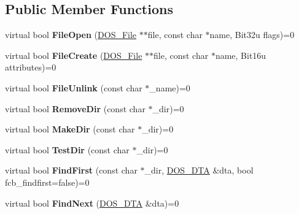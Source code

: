 \subsection*{Public Member Functions}
\begin{DoxyCompactItemize}
\item 
\hypertarget{classDOS__Drive_a89edfab101b6473ab2c78e6d0a60a664}{virtual bool {\bfseries File\-Open} (\hyperlink{classDOS__File}{D\-O\-S\-\_\-\-File} $\ast$$\ast$file, const char $\ast$name, Bit32u flags)=0}\label{classDOS__Drive_a89edfab101b6473ab2c78e6d0a60a664}

\item 
\hypertarget{classDOS__Drive_aadcc90a2e2c8227e245bdb226abdc1d2}{virtual bool {\bfseries File\-Create} (\hyperlink{classDOS__File}{D\-O\-S\-\_\-\-File} $\ast$$\ast$file, const char $\ast$name, Bit16u attributes)=0}\label{classDOS__Drive_aadcc90a2e2c8227e245bdb226abdc1d2}

\item 
\hypertarget{classDOS__Drive_ad82f3601ae44410db65241752bdb0d37}{virtual bool {\bfseries File\-Unlink} (const char $\ast$\-\_\-name)=0}\label{classDOS__Drive_ad82f3601ae44410db65241752bdb0d37}

\item 
\hypertarget{classDOS__Drive_ade3271a57f28cc1a18dc84714dc2611b}{virtual bool {\bfseries Remove\-Dir} (const char $\ast$\-\_\-dir)=0}\label{classDOS__Drive_ade3271a57f28cc1a18dc84714dc2611b}

\item 
\hypertarget{classDOS__Drive_aa16cb38b04fd09608c749d2cf786fd21}{virtual bool {\bfseries Make\-Dir} (const char $\ast$\-\_\-dir)=0}\label{classDOS__Drive_aa16cb38b04fd09608c749d2cf786fd21}

\item 
\hypertarget{classDOS__Drive_a55e8ba77ed5a74e6a27932c3177b0998}{virtual bool {\bfseries Test\-Dir} (const char $\ast$\-\_\-dir)=0}\label{classDOS__Drive_a55e8ba77ed5a74e6a27932c3177b0998}

\item 
\hypertarget{classDOS__Drive_a85a98cf83473db4fb4fd15a7e1d9b21f}{virtual bool {\bfseries Find\-First} (const char $\ast$\-\_\-dir, \hyperlink{classDOS__DTA}{D\-O\-S\-\_\-\-D\-T\-A} \&dta, bool fcb\-\_\-findfirst=false)=0}\label{classDOS__Drive_a85a98cf83473db4fb4fd15a7e1d9b21f}

\item 
\hypertarget{classDOS__Drive_aa2feef7be81869b683b6945159df5149}{virtual bool {\bfseries Find\-Next} (\hyperlink{classDOS__DTA}{D\-O\-S\-\_\-\-D\-T\-A} \&dta)=0}\label{classDOS__Drive_aa2feef7be81869b683b6945159df5149}


\end{DoxyCompactItemize}
